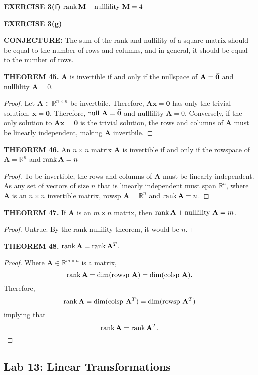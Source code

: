 \documentclass[12pt]{article}
\newcommand{\mat}[1]{\mathbf{#1}}
\newcommand{\exercise}[1]{\textbf{EXERCISE #1}\label{#1}}
\newcommand{\theorem}[2]{\textbf{THEOREM #1.} #2}
\newcommand{\conjecture}[1]{\textbf{CONJECTURE:} #1}
\newcommand{\nullsp}{\text{null }}
\newcommand{\nullility}{\text{nulllility }}
\newcommand{\rowsp}{\text{rowsp }}
\newcommand{\colsp}{\text{colsp }}
\begin{document}
\exercise{3(f)} $\rank \mat{M} + \nullility \mat{M} = 4$

\exercise{3(g)} 

\conjecture{The sum of the rank and nullility of a square matrix should be equal to the number of rows and columns, and in general, it should be equal to the number of rows.}

\theorem{45}{$\mat{A}$ is invertible if and only if the nullspace of $\mat{A} = \va{0}$ and $\nullility \mat{A} = 0$.}

\begin{proof}
Let $\mat{A} \in \mathbb{R}^{n \times n}$ be invertbile. Therefore, $\mat{Ax=0}$ has only the trivial solution, $\mat{x=0}$. Therefore, $\nullsp \mat{A} = \va{0}$ and $\nullility \mat{A} = 0$. Conversely, if the only solution to $\mat{Ax=0}$ is the trivial solution, the rows and columns of $\mat{A}$ must be linearly independent, making $\mat{A}$ invertbile.
\end{proof}

\theorem{46}{An $n \times n$ matrix $\mat{A}$ is invertible if and only if the rowspace of $\mat{A} = \mathbb{R}^{n}$ and $\rank \mat{A} = n$}

\begin{proof}
To be invertible, the rows and columns of $\mat{A}$ must be linearly independent. As any set of vectors of size $n$ that is linearly independent must span $\mathbb{R}^{n}$, where $\mat{A}$ is an $n \times n$ invertible matrix, $\rowsp \mat{A} = \mathbb{R}^{n}$ and $\rank \mat{A} = n$.
\end{proof}

\theorem{47}{If $\mat{A}$ is an $m \times n$ matrix, then $\rank \mat{A} + \nullility \mat{A} = m$.}

\begin{proof}
Untrue. By the rank-nullility theorem, it would be $n$.
\end{proof}

\theorem{48}{$\rank \mat{A} = \rank \mat{A}^{T}.$}

\begin{proof}
Where $\mat{A} \in \mathbb{R}^{m \times n}$ is a matrix, $$\rank \mat{A} = \dim (\rowsp \mat{A}) = \dim (\colsp \mat{A}).$$
Therefore,
$$\rank \mat{A} = \dim(\colsp \mat{A}^{T}) = \dim(\rowsp \mat{A}^{T})$$
implying that
$$\rank \mat{A} = \rank \mat{A}^{T}.$$
\end{proof}

\subsection{Lab 13: Linear Transformations}
\end{document}
